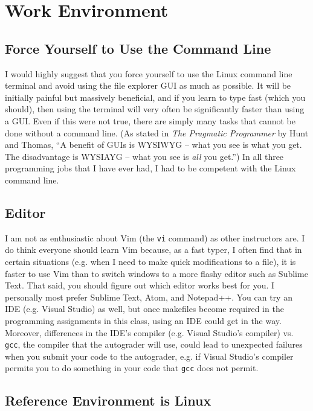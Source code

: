 \documentclass{article}
\begin{document}
\section{Work Environment}

\subsection{Force Yourself to Use the Command Line}

I would highly suggest that you force yourself to use the Linux command line terminal and avoid using the file explorer GUI as much as possible. It will be initially painful but massively beneficial, and if you learn to type fast (which you should), then using the terminal will very often be significantly faster than using a GUI. Even if this were not true, there are simply many tasks that cannot be done without a command line. (As stated in \textit{The Pragmatic Programmer} by Hunt and Thomas, ``A benefit of GUIs is WYSIWYG -- what you see is what you get. The disadvantage is WYSIAYG -- what you see is \textit{all} you get.'') In all three programming jobs that I have ever had, I had to be competent with the Linux command line.

\subsection{Editor}

I am not as enthusiastic about Vim (the \lstinline{vi} command) as other instructors are. I do think everyone should learn Vim because, as a fast typer, I often find that in certain situations (e.g. when I need to make quick modifications to a file), it is faster to use Vim than to switch windows to a more flashy editor such as Sublime Text. That said, you should figure out which editor works best for you. I personally most prefer Sublime Text, Atom, and Notepad++. You can try an IDE (e.g. Visual Studio) as well, but once makefiles become required in the programming assignments in this class, using an IDE could get in the way. Moreover, differences in the IDE's compiler (e.g. Visual Studio's compiler) vs. \lstinline{gcc}, the compiler that the autograder will use, could lead to unexpected failures when you submit your code to the autograder, e.g. if Visual Studio's compiler permits you to do something in your code that \lstinline{gcc} does not permit.

\subsection{Reference Environment is Linux}
\end{document}
